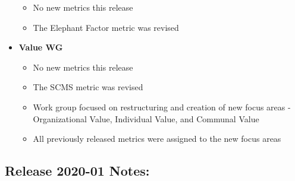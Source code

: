 \begin{itemize}
  \begin{itemize}
  \tightlist
  \item
    No new metrics this release
  \item
    The Elephant Factor metric was revised
  \end{itemize}
\item
  \textbf{Value WG}

  \begin{itemize}
  \tightlist
  \item
    No new metrics this release
  \item
    The SCMS metric was revised
  \item
    Work group focused on restructuring and creation of new focus areas
    - Organizational Value, Individual Value, and Communal Value
  \item
    All previously released metrics were assigned to the new focus areas
  \end{itemize}
\end{itemize}

\hypertarget{release-2020-01-notes}{%
\subsection{Release 2020-01 Notes:}\label{release-2020-01-notes}}

